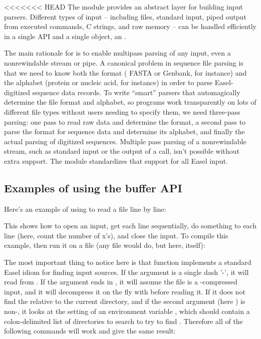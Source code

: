 <<<<<<< HEAD
The  module provides an abstract layer for building
input parsers. Different types of input -- including files, standard
input, piped output from executed commands, C strings, and raw memory
-- can be handled efficiently in a single API and a single object, an
. 

The main rationale for  is to enable multipass parsing
of any input, even a nonrewindable stream or pipe. A canonical problem
in sequence file parsing is that we need to know both the format (
FASTA or Genbank, for instance) and the alphabet (protein or nucleic
acid, for instance) in order to parse Easel-digitized sequence data
records. To write ``smart'' parsers that automagically determine the
file format and alphabet, so programs work transparently on lots of
different file types without users needing to specify them, we need
three-pass parsing: one pass to read raw data and determine the
format, a second pass to parse the format for sequence data and
determine its alphabet, and finally the actual parsing of digitized
sequences. Multiple pass parsing of a nonrewindable stream, such as
standard input or the output of a  call, isn't possible
without extra support. The  module standardizes that
support for all Easel input.

\subsection{Examples of using the buffer API}

Here's an example of using  to read a file line by
line:



This shows how to open an input, get each line sequentially, do
something to each line (here, count the number of x's), and close the
input.  To compile this example, then run it on a file (any file would
do, but here,  itself):


The most important thing to notice here is that
 function implements a standard Easel idiom
for finding input sources. If the  argument is a
single dash '-', it will read from . If the
 argument ends in , it will assume the file
is a -compressed input, and it will decompress it on the
fly with  before reading it. If it does not find the
 relative to the current directory, and if the second
argument (here ) is non-, it looks at the
setting of an environment variable , which should
contain a colon-delimited list of directories to search to try to find
. Therefore all of the following commands will work
and give the same result:

